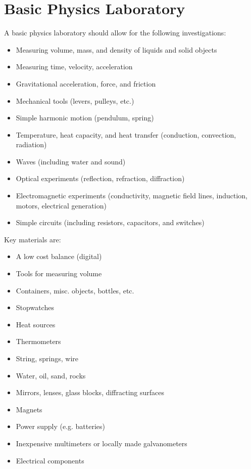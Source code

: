 \section{Basic Physics Laboratory}

A basic physics laboratory should allow for the following investigations:
\begin{itemize}
\item{Measuring volume, mass, and density of liquids and solid objects}
\item{Measuring time, velocity, acceleration}
\item{Gravitational acceleration, force, and friction}
\item{Mechanical tools (levers, pulleys, etc.)}
\item{Simple harmonic motion (pendulum, spring)}
\item{Temperature, heat capacity, and heat transfer 
(conduction, convection, radiation)}
\item{Waves (including water and sound)}
\item{Optical experiments (reflection, refraction, diffraction)}
\item{Electromagnetic experiments 
(conductivity, magnetic field lines, 
induction, motors, electrical generation)}
\item{Simple circuits (including resistors, capacitors, and switches)}
\end{itemize}

Key materials are:
\begin{itemize}
\item{A low cost balance (digital)}
\item{Tools for measuring volume}
\item{Containers, misc. objects, bottles, etc.}
\item{Stopwatches}
\item{Heat sources}
\item{Thermometers}
\item{String, springs, wire}
\item{Water, oil, sand, rocks}
\item{Mirrors, lenses, glass blocks, diffracting surfaces}
\item{Magnets}
\item{Power supply (e.g. batteries)}
\item{Inexpensive multimeters or locally made galvanometers}
\item{Electrical components}
\end{itemize}
